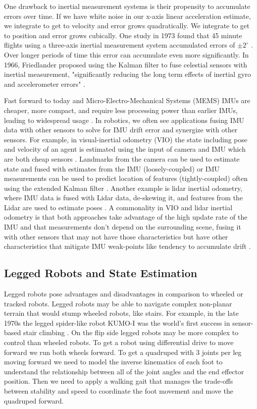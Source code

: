 \documentclass[conference]{IEEEtran}
\begin{document}
One drawback to inertial measurement systems is their propensity to accumulate errors over time. If we have white noise in our x-axis linear acceleration estimate, we integrate to get to velocity and error grows quadratically. We integrate to get to position and error grows cubically. One study in 1973 found that 45 minute flights using a three-axis inertial measurement system accumulated errors of $\pm 2^{\circ}$ \cite{b4}. Over longer periods of time this error can accumulate even more significantly. In 1966, Friedlander proposed using the Kalman filter to fuse celestial sensors with inertial measurement, "significantly reducing the long term effects of inertial gyro and accelerometer errors" \cite{b5}.

Fast forward to today and Micro-Electro-Mechanical Systems (MEMS) IMUs are cheaper, more compact, and require less processing power than earlier IMUs, leading to widespread usage \cite{b6}. In robotics, we often see applications fusing IMU data with other sensors to solve for IMU drift error and synergize with other sensors. For example, in visual-inertial odometry (VIO) the state including pose and velocity of an agent is estimated using the input of camera and IMU which are both cheap sensors \cite{b7}. Landmarks from the camera can be used to estimate state and fused with estimates from the IMU (loosely-coupled) or IMU measurements can be used to predict location of features (tightly-coupled) often using the extended Kalman filter \cite{b7}. Another example is lidar inertial odometry, where IMU data is fused with Lidar data, de-skewing it, and features from the Lidar are used to estimate poses \cite{b8}. A commonality in VIO and lidar inertial odometry is that both approaches take advantage of the high update rate of the IMU and that measurements don't depend on the surrounding scene, fusing it with other sensors that may not have those characteristics but have other characteristics that mitigate IMU weak-points like tendency to accumulate drift \cite{b7} \cite{b8}.

\subsection{Legged Robots and State Estimation}
Legged robots pose advantages and disadvantages in comparison to wheeled or tracked robots. Legged robots may be able to navigate complex non-planar terrain that would stump wheeled robots, like stairs. For example, in the late 1970s the legged spider-like robot KUMO-I was the world's first success in sensor-based stair climbing \cite{b9}. On the flip side legged robots may be more complex to control than wheeled robots. To get a robot using differential drive to move forward we run both wheels forward. To get a quadruped with 3 joints per leg moving forward we need to model the inverse kinematics of each foot to understand the relationship between all of the joint angles and the end effector position. Then we need to apply a walking gait that manages the trade-offs between stability and speed to coordinate the foot movement and move the quadruped forward.
\end{document}
